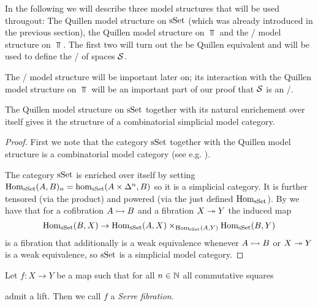 In the following we will describe three model structures that will be used througout: 
The Quillen model structure on $\operatorname{sSet}$ (which was already introduced in the previous section), the Quillen model structure on $\Top$ and the \Strom/ model structure on $\Top$.
The first two will turn out the be Quillen equivalent and will be used to define the \inftycat/ of spaces $\mathcal{S}$.

The \Strom/ model structure will be important later on; its interaction with the Quillen model structure on $\Top$ will be an important part of our proof that $\mathcal{S}$ is an \inftytop/.
\begin{prop}\label{prop:sSetCombSimpModelStructure}
    The Quillen model structure on $\operatorname{sSet}$ together with its natural enrichement over itself gives it the structure of a combinatorial simplicial model category.
    \begin{proof}
        First we note that the category $\operatorname{sSet}$ together with the Quillen model structure is a combinatorial model category (see e.g. \cite[Remark 7.11.15]{cisinski_2019}).
        
        The category $\operatorname{sSet}$ is enriched over itself by setting $\operatorname{Hom}_{\operatorname{sSet}}(A,B)_n=\hom_{\operatorname{sSet}}(A\times\Delta^n,B)$ so it is a simplicial category.
        It is further tensored (via the product) and powered (via the just defined $\operatorname{Hom}_{\operatorname{sSet}}$).
        By \cite[Corollary 1.4.5.6, Theorem 3.1.3.1 and Theorem 3.1.3.5]{kerodon} we have that for a cofibration $A\xtailrightarrow{} B$ and a fibration $X\xtwoheadrightarrow{} Y$ the induced map 
        \begin{equation*}
            \operatorname{Hom}_{\operatorname{sSet}}(B,X)\to\operatorname{Hom}_{\operatorname{sSet}}(A,X)\times_{\operatorname{Hom}_{\operatorname{sSet}}(A,Y)}\operatorname{Hom}_{\operatorname{sSet}}(B,Y)
        \end{equation*}
        is a fibration that additionally is a weak equivalence whenever $A\xtailrightarrow{} B$ or $X\xtwoheadrightarrow{} Y$ is a weak equivalence, so $\operatorname{sSet}$ is a simplicial model category.
    \end{proof}
\end{prop}
\begin{definition}
    Let $f\colon X\to Y$ be a map such that for all $n\in\mathbb{N}$ all commutative squares
    \begin{center}
    \end{center}
    admit a lift. 
    Then we call $f$ a \emph{Serre fibration}.
\end{definition}
